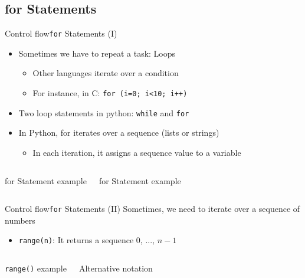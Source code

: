 \documentclass[10pt,compress]{beamer} %
\begin{document}
\subsection{for Statements}
\begin{frame}{Control flow}{\texttt{for} Statements (I)}
	\begin{itemize}
		\item Sometimes we have to repeat a task: Loops
			\begin{itemize}
			\item Other languages iterate over a condition
			\item For instance, in C: \texttt{for (i=0; i<10; i++)}
			\end{itemize}
		\item Two loop statements in python: \texttt{while} and \texttt{for}
		\item In Python, for iterates over a sequence (lists or strings)
			\begin{itemize}
			\item In each iteration, it assigns a sequence value to a variable
			\end{itemize}
	\end{itemize}

    \begin{columns}
		\begin{exampleblock}{for Statement example}
		
		\end{exampleblock}

		\begin{exampleblock}{for Statement example}
		
		\end{exampleblock}
	\end{columns}
\end{frame}

\begin{frame}{Control flow}{\texttt{for} Statements (II)}
	Sometimes, we need to iterate over a sequence of numbers
	\begin{itemize}
		\item \texttt{range(n)}: It returns a sequence $0$, ..., $n-1$
	\end{itemize}

    \begin{columns}
		\begin{exampleblock}{\texttt{range()} example}
		
		\end{exampleblock}
		
		\begin{exampleblock}{Alternative notation}
		
		\end{exampleblock}
	\end{columns}
\end{frame}
\end{document}
